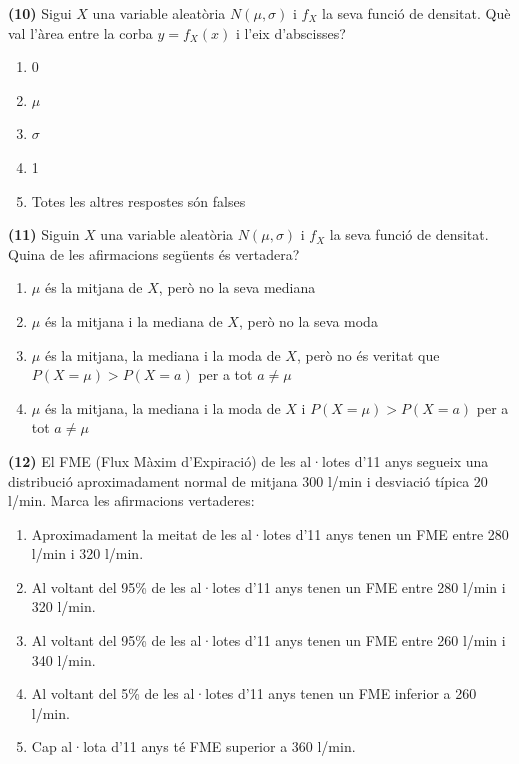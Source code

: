 \documentclass[
]{book}
\providecommand{\tightlist}{%
  \setlength{\itemsep}{0pt}\setlength{\parskip}{0pt}}
\theoremstyle{definition}
\theoremstyle{definition}
\theoremstyle{definition}
\theoremstyle{remark}
\begin{document}
\textbf{(10)} Sigui \(X\) una variable aleatòria \(N(\mu,\sigma)\) i \(f_X\) la seva funció de densitat. Què val l'àrea entre la corba \(y=f_X(x)\) i l'eix d'abscisses?

\begin{enumerate}
\def\labelenumi{\arabic{enumi}.}
\tightlist
\item
  0
\item
  \(\mu\)
\item
  \(\sigma\)
\item
  1
\item
  Totes les altres respostes són falses
\end{enumerate}

\textbf{(11)} Siguin \(X\) una variable aleatòria \(N(\mu,\sigma)\) i \(f_X\) la seva funció de densitat. Quina de les afirmacions següents és vertadera?

\begin{enumerate}
\def\labelenumi{\arabic{enumi}.}
\tightlist
\item
  \(\mu\) és la mitjana de \(X\), però no la seva mediana
\item
  \(\mu\) és la mitjana i la mediana de \(X\), però no la seva moda
\item
  \(\mu\) és la mitjana, la mediana i la moda de \(X\), però no és veritat que \(P(X=\mu)>P(X=a)\) per a tot \(a\neq \mu\)
\item
  \(\mu\) és la mitjana, la mediana i la moda de \(X\) i \(P(X=\mu)>P(X=a)\) per a tot \(a\neq \mu\)
\end{enumerate}

\textbf{(12)} El FME (Flux Màxim d'Expiració) de les al·lotes d'11 anys segueix una distribució aproximadament normal de mitjana 300 l/min i desviació típica 20 l/min. Marca les afirmacions vertaderes:

\begin{enumerate}
\def\labelenumi{\arabic{enumi}.}
\tightlist
\item
  Aproximadament la meitat de les al·lotes d'11 anys tenen un FME entre 280 l/min i 320 l/min.
\item
  Al voltant del 95\% de les al·lotes d'11 anys tenen un FME entre 280 l/min i 320 l/min.
\item
  Al voltant del 95\% de les al·lotes d'11 anys tenen un FME entre 260 l/min i 340 l/min.
\item
  Al voltant del 5\% de les al·lotes d'11 anys tenen un FME inferior a 260 l/min.
\item
  Cap al·lota d'11 anys té FME superior a 360 l/min.
\end{enumerate}
\end{document}
